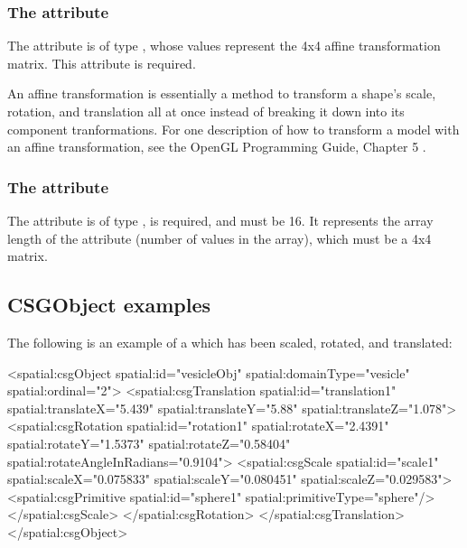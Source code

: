 \subsubsection{The \fixttspace{} attribute}
The  attribute is of type , whose values represent the 4x4 affine transformation matrix. This attribute is required.

An affine transformation is essentially a method to transform a shape's scale, rotation, and translation all at once instead of breaking it down into its component tranformations.  For one description of how to transform a model with an affine transformation, see the OpenGL Programming Guide, Chapter 5 \citep{shreiner2013opengl}.



\subsubsection{The \fixttspace{} attribute}
The  attribute is of type , is required, and must be 16. It represents the array length of the  attribute (number of values in the  array), which must be a 4x4 matrix.


\subsection{CSGObject examples}
\label{csgobject-example}
The following is an example of a \CSGObject which has been scaled, rotated, and translated:

\begin{example}
  <spatial:csgObject spatial:id="vesicleObj" spatial:domainType="vesicle"
                     spatial:ordinal="2">
    <spatial:csgTranslation spatial:id="translation1" spatial:translateX="5.439"
                            spatial:translateY="5.88" spatial:translateZ="1.078">
      <spatial:csgRotation  spatial:id="rotation1" spatial:rotateX="2.4391"
                            spatial:rotateY="1.5373" spatial:rotateZ="0.58404"
                            spatial:rotateAngleInRadians="0.9104">
        <spatial:csgScale   spatial:id="scale1" spatial:scaleX="0.075833"
                            spatial:scaleY="0.080451" spatial:scaleZ="0.029583">
          <spatial:csgPrimitive spatial:id="sphere1" spatial:primitiveType="sphere"/>
       </spatial:csgScale>
      </spatial:csgRotation>
    </spatial:csgTranslation>
  </spatial:csgObject>
\end{example}

